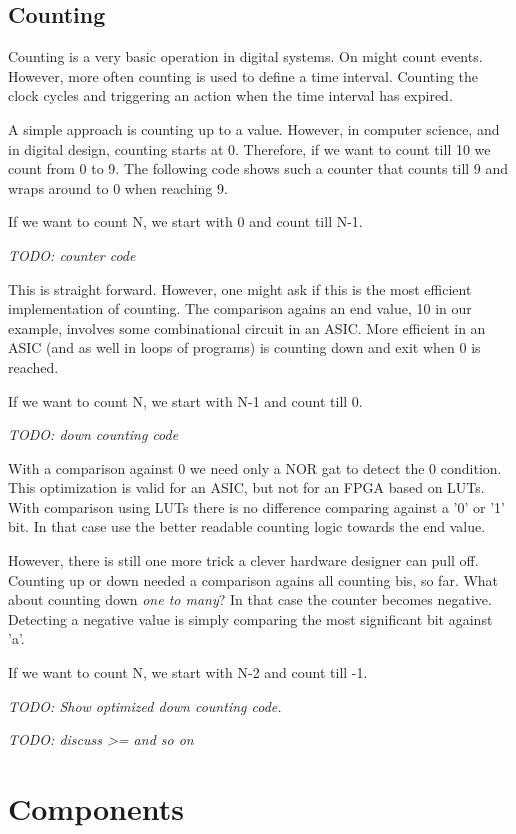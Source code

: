 \documentclass[a4paper]{article}
\newcommand{\todo}[1]{{\emph{TODO: #1}}}
\begin{document}
\subsection{Counting}

Counting is a very basic operation in digital systems. On might count events.
However, more often counting is used to define a time interval. Counting the
clock cycles and triggering an action when the time interval has expired.

A simple approach is counting up to a value. However, in computer science,
and in digital design, counting starts at 0. Therefore, if we want to count till
10 we count from 0 to 9. The following code shows such a counter that counts
till 9 and wraps around to 0 when reaching 9.

If we want to count N, we start with 0 and count till N-1.

\todo{counter code}



This is straight forward. However, one might ask if this is the most efficient
implementation of counting. The comparison agains an end value, 10 in our
example, involves some combinational circuit in an ASIC. More efficient in an
ASIC (and as well in loops of programs) is counting down and exit when 0
is reached.

If we want to count N, we start with N-1 and count till 0.

\todo{down counting code}

With a comparison against 0 we need only a NOR gat to detect the 0 condition.
This optimization is valid for an ASIC, but not for an FPGA based on LUTs.
With comparison using LUTs there is no difference comparing against a '0' or
'1' bit. In that case use the better readable counting logic towards the end value.

However, there is still one more trick a clever hardware designer can pull off.
Counting up or down needed a comparison agains all counting bis, so far.
What about counting down \emph{one to many}? In that case the counter
becomes negative. Detecting a negative value is simply comparing the
most significant bit against 'a'.

If we want to count N, we start with N-2 and count till -1.

\todo{Show optimized down counting code.}


\todo{discuss >= and so on}

\section{Components}
\end{document}
